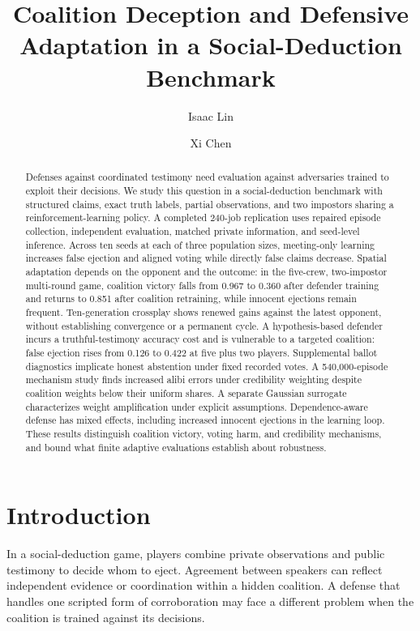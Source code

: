 \documentclass[
  12pt,
]{article}
\title{Coalition Deception and Defensive Adaptation in a
Social-Deduction Benchmark}
\author{Isaac Lin \and Xi Chen}
\date{}
\begin{document}
\maketitle
\begin{abstract}
Defenses against coordinated testimony need evaluation against
adversaries trained to exploit their decisions. We study this question
in a social-deduction benchmark with structured claims, exact truth
labels, partial observations, and two impostors sharing a
reinforcement-learning policy. A completed 240-job replication uses
repaired episode collection, independent evaluation, matched private
information, and seed-level inference. Across ten seeds at each of three
population sizes, meeting-only learning increases false ejection and
aligned voting while directly false claims decrease. Spatial adaptation
depends on the opponent and the outcome: in the five-crew, two-impostor
multi-round game, coalition victory falls from 0.967 to 0.360 after
defender training and returns to 0.851 after coalition retraining, while
innocent ejections remain frequent. Ten-generation crossplay shows
renewed gains against the latest opponent, without establishing
convergence or a permanent cycle. A hypothesis-based defender incurs a
truthful-testimony accuracy cost and is vulnerable to a targeted
coalition: false ejection rises from 0.126 to 0.422 at five plus two
players. Supplemental ballot diagnostics implicate honest abstention
under fixed recorded votes. A 540,000-episode mechanism study finds
increased alibi errors under credibility weighting despite coalition
weights below their uniform shares. A separate Gaussian surrogate
characterizes weight amplification under explicit assumptions.
Dependence-aware defense has mixed effects, including increased innocent
ejections in the learning loop. These results distinguish coalition
victory, voting harm, and credibility mechanisms, and bound what finite
adaptive evaluations establish about robustness.
\end{abstract}

\FloatBarrier

\section{Introduction}\label{introduction}

In a social-deduction game, players combine private observations and
public testimony to decide whom to eject. Agreement between speakers can
reflect independent evidence or coordination within a hidden coalition.
A defense that handles one scripted form of corroboration may face a
different problem when the coalition is trained against its decisions.
\end{document}
